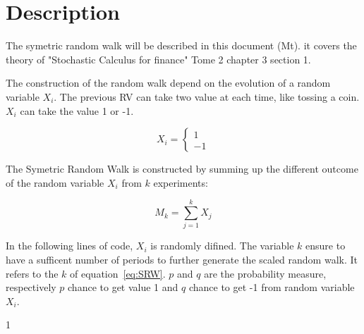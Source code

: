 \documentclass{article}
\begin{document}


\section{Description}
The symetric random walk will be described in this document (Mt). it covers the theory of "Stochastic Calculus for finance" Tome 2 chapter 3 section 1.

The construction of the random walk depend on the evolution of a random variable $X_i$. The previous RV can take two value at each time, like tossing a coin. $X_i$ can take the value 1 or -1.

\begin{equation}
 \label{eq:Xi}
X_i = 
\left \{{
  \begin{array}{c} 1 \\ -1 \end{array}
  }\right .
\end{equation}
 
The Symetric Random Walk is constructed by summing up the different outcome of the random variable $X_i$ from $k$ experiments:

\begin{equation}
\label{eq:SRW}
M_k = 
\sum_{j=1}^k X_j
\end{equation}

In the following lines of code, $X_i$ is randomly difined. The variable $k$ ensure to have a sufficent number of periods to further generate the scaled random walk.
It refers to the $k$ of equation~\ref{eq:SRW}.
$p$ and $q$ are the probability measure, respectively $p$ chance to get value 1 and $q$ chance to get -1 from random variable $X_i$.

\begin{Schunk}
\begin{Soutput}
[1] 1
\end{Soutput}
\end{Schunk}
\end{document}
